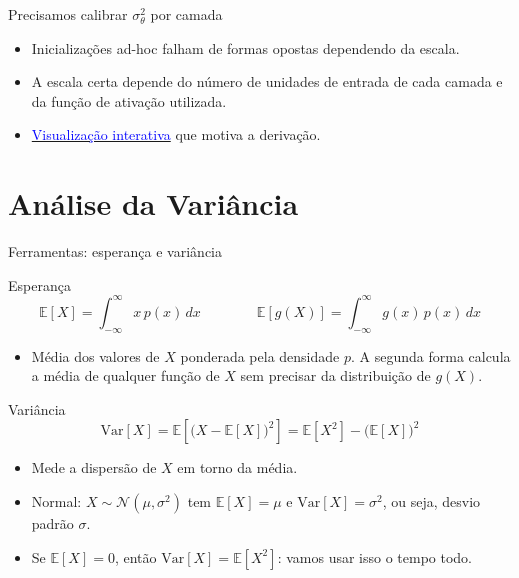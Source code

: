 \documentclass[aspectratio=169,xcolor=dvipsnames]{beamer}
\begin{document}
  \begin{frame}{Precisamos calibrar $\sigma_\theta^2$ por camada}
    \begin{itemize}
      \item Inicializações ad-hoc falham de formas opostas dependendo da escala.
      \item A escala certa depende do número de unidades de entrada de cada camada
        e da função de ativação utilizada.
      \item \href{https://lucaskup.github.io/deep-learning-course/weight-init/}{%
          \textcolor{blue}{Visualização interativa}} que motiva a derivação.
    \end{itemize}
  \end{frame}

  \section{Análise da Variância}

  \begin{frame}{Ferramentas: esperança e variância}
    \begin{block}{Esperança}
      \[
        \mathbb{E}[X] = \int_{-\infty}^{\infty} x\,p(x)\,dx
        \qquad\qquad
        \mathbb{E}[g(X)] = \int_{-\infty}^{\infty} g(x)\,p(x)\,dx
      \]
    \end{block}
    \begin{itemize}
      \item Média dos valores de $X$ ponderada pela densidade $p$. A segunda forma
        calcula a média de qualquer função de $X$ sem precisar da distribuição de $g(X)$.
    \end{itemize}
    \vfill
    \begin{block}{Variância}
      \[
        \mathrm{Var}[X] = \mathbb{E}\!\left[\big(X - \mathbb{E}[X]\big)^2\right]
          = \mathbb{E}[X^2] - \big(\mathbb{E}[X]\big)^2
      \]
    \end{block}
    \begin{itemize}
      \item Mede a dispersão de $X$ em torno da média.
      \item Normal: $X\sim\mathcal{N}(\mu,\sigma^2)$ tem $\mathbb{E}[X]=\mu$ e
        $\mathrm{Var}[X]=\sigma^2$, ou seja, desvio padrão $\sigma$.
      \item Se $\mathbb{E}[X] = 0$, então $\mathrm{Var}[X] = \mathbb{E}[X^2]$: vamos usar
        isso o tempo todo.
    \end{itemize}
  \end{frame}
\end{document}
